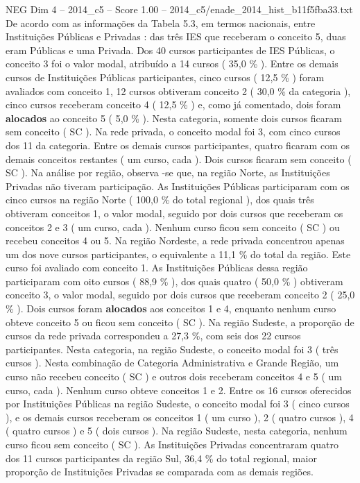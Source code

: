 \begin{textsample}{NEG Dim 4 – 2014\_c5 – Score 1.00 – 2014\_c5/enade\_2014\_hist\_b11f5fba33.txt}
De acordo com as informações da Tabela 5.3, em termos nacionais, entre Instituições Públicas e Privadas : das três IES que receberam o conceito 5, duas eram Públicas e uma Privada.
Dos 40 cursos participantes de IES Públicas, o conceito 3 foi o valor modal, atribuído a 14 cursos ( 35,0 \% ).
Entre os demais cursos de Instituições Públicas participantes, cinco cursos ( 12,5 \% ) foram avaliados com conceito 1, 12 cursos obtiveram conceito 2 ( 30,0 \% da categoria ), cinco cursos receberam conceito 4 ( 12,5 \% ) e, como já comentado, dois foram \textbf{alocados} ao conceito 5 ( 5,0 \% ).
Nesta categoria, somente dois cursos ficaram sem conceito ( SC ).
Na rede privada, o conceito modal foi 3, com cinco cursos dos 11 da categoria.
Entre os demais cursos participantes, quatro ficaram com os demais conceitos restantes ( um curso, cada ).
Dois cursos ficaram sem conceito ( SC ).
Na análise por região, observa -se que, na região Norte, as Instituições Privadas não tiveram participação.
As Instituições Públicas participaram com os cinco cursos na região Norte ( 100,0 \% do total regional ), dos quais três obtiveram conceitos 1, o valor modal, seguido por dois cursos que receberam os conceitos 2 e 3 ( um curso, cada ).
Nenhum curso ficou sem conceito ( SC ) ou recebeu conceitos 4 ou 5.
Na região Nordeste, a rede privada concentrou apenas um dos nove cursos participantes, o equivalente a 11,1 \% do total da região.
Este curso foi avaliado com conceito 1.
As Instituições Públicas dessa região participaram com oito cursos ( 88,9 \% ), dos quais quatro ( 50,0 \% ) obtiveram conceito 3, o valor modal, seguido por dois cursos que receberam conceito 2 ( 25,0 \% ).
Dois cursos foram \textbf{alocados} aos conceitos 1 e 4, enquanto nenhum curso obteve conceito 5 ou ficou sem conceito ( SC ).
Na região Sudeste, a proporção de cursos da rede privada correspondeu a 27,3 \%, com seis dos 22 cursos participantes.
Nesta categoria, na região Sudeste, o conceito modal foi 3 ( três cursos ).
Nesta combinação de Categoria Administrativa e Grande Região, um curso não recebeu conceito ( SC ) e outros dois receberam conceitos 4 e 5 ( um curso, cada ).
Nenhum curso obteve conceitos 1 e 2.
Entre os 16 cursos oferecidos por Instituições Públicas na região Sudeste, o conceito modal foi 3 ( cinco cursos ), e os demais cursos receberam os conceitos 1 ( um curso ), 2 ( quatro cursos ), 4 ( quatro cursos ) e 5 ( dois cursos ).
Na região Sudeste, nesta categoria, nenhum curso ficou sem conceito ( SC ).
As Instituições Privadas concentraram quatro dos 11 cursos participantes da região Sul, 36,4 \% do total regional, maior proporção de Instituições Privadas se comparada com as demais regiões.

\end{textsample}
